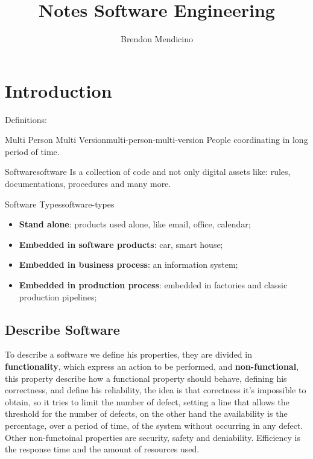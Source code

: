 \documentclass[12pt]{article}
\title{Notes Software Engineering}
\author{Brendon Mendicino}
\begin{document}
\maketitle
\newpage
\tableofcontents
\newpage



\section{Introduction}
Definitions:
\begin{definition}{Multi Person Multi Version}{multi-person-multi-version}
    People coordinating in long period of time.
\end{definition}
\begin{definition}{Software}{software}
    Is a collection of code and not only digital assets like: rules, documentations, procedures and many more. 
\end{definition}
\begin{definition}{Software Types}{software-types}
    \begin{itemize}
        \item \textbf{Stand alone}: products used alone, like email, office, calendar;
        \item \textbf{Embedded in software products}: car, smart house;
        \item \textbf{Embedded in business process}: an information system;
        \item \textbf{Embedded in production process}: embedded in factories and classic production pipelines;
    \end{itemize}
\end{definition}

\subsection{Describe Software}
To describe a software we define his properties, they are divided in \textbf{functionality}, which express an action to be performed, and \textbf{non-functional}, this property describe how a functional property should behave, defining his correctness, and define his reliability, the idea is that corectness it's impossible to obtain, so it tries to limit the number of defect, setting a line that allows the threshold for the number of defects, on the other hand the availability is the percentage, over a period of time, of the system without occurring in any defect. Other non-functoinal properties are security, safety and deniability. Efficiency is the response time and the amount of resources used.
\end{document}

